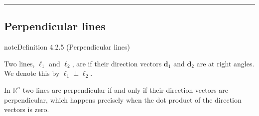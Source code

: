 \documentclass[letterpaper,10pt,english]{jupyterBook}
\begin{document}
\bigskip\hrule\bigskip


\ignorespaces 

\subsection{Perpendicular lines}
\label{\detokenize{_pages/4.1_Lines:perpendicular-lines}}\label{\detokenize{_pages/4.1_Lines:index-5}}\label{_pages/4.1_Lines:perpendicular-lines-definition}
\begin{sphinxadmonition}{note}{Definition 4.2.5 (Perpendicular lines)}



\sphinxAtStartPar
Two lines, \(\ell_1\) and \(\ell_2\), are  if their direction vectors \(\mathbf{d}_1\) and \(\mathbf{d}_2\) are at right angles. We denote this by \(\ell_1 \perp \ell_2\).

\sphinxAtStartPar
In \(\mathbb{R}^n\) two lines are perpendicular if and only if their direction vectors are perpendicular, which happens precisely when the dot product of the direction vectors is zero.
\end{sphinxadmonition}
\label{_pages/4.1_Lines:perpendicular-lines-example}
\end{document}
